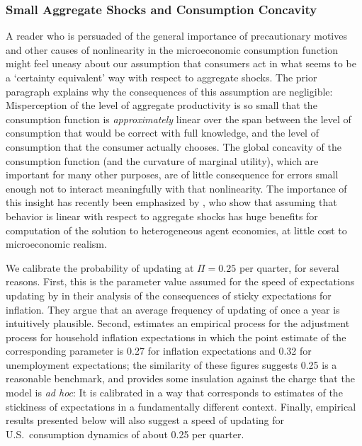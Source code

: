 \documentclass[titlepage]{./econtex}
\begin{document}
\subsubsection{Small Aggregate Shocks and Consumption Concavity}
A reader who is persuaded of the general importance of precautionary motives and other causes of nonlinearity in the microeconomic consumption function might feel uneasy about our assumption that consumers act in what seems to be a `certainty equivalent' way with respect to aggregate shocks.  The prior paragraph explains why the consequences of this assumption are negligible: Misperception of the level of aggregate productivity is so small that the consumption function is \textit{approximately} linear over the span between the level of consumption that would be correct with full knowledge, and the level of consumption that the consumer actually chooses.  The global concavity of the consumption function (and the curvature of marginal utility), which are important for many other purposes, are of little consequence for errors small enough not to interact meaningfully with that nonlinearity.  The importance of this insight has recently been emphasized by \cite{bmpMITshocks}, who show that assuming that behavior is linear with respect to aggregate shocks has huge benefits for computation of the solution to heterogeneous agent economies, at little cost to microeconomic realism.

We calibrate the probability of updating at $\Pi= %
0.25 %
 $ per quarter, for several reasons.  First, this is the parameter value assumed for the speed of expectations updating by \cite{mrSlumps} in their analysis of the consequences of sticky expectations for inflation.  They argue that an average frequency of updating of once a year is intuitively plausible.  Second, \cite{carroll:epidemicinflQJE} estimates an empirical process for the adjustment process for household inflation expectations in which the point estimate of the corresponding parameter is 0.27 for inflation expectations and 0.32 for unemployment expectations; the similarity of these figures suggests 0.25 is a reasonable benchmark, and provides some insulation against the charge that the model is {\it ad hoc}: It is calibrated in a way that corresponds to estimates of the stickiness of expectations in a fundamentally different context.  Finally, empirical results presented below will also suggest a speed of updating for U.S.\ consumption dynamics of about 0.25 per quarter.
\end{document}

